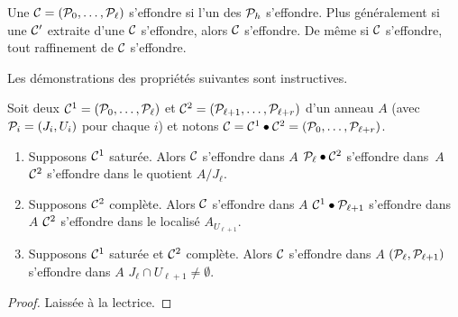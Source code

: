 \begin{lemma} 
\label{lemma} 
\label{factColAc} 
Une \proc ${\cal C}=({\cal P}_0,\ldots,{\cal P}_\ell)$ s'effondre  si l'un des ${\cal P}_h$  s'effondre. Plus généralement si une \proc ${\cal C}'$ extraite d'une \proc ${\cal C}$ s'effondre, alors ${\cal C}$ s'effondre. De même si  ${\cal C}$ s'effondre, tout raffinement de ${\cal C}$ s'effondre.  
\end{lemma}
Les démonstrations des propriétés suivantes sont instructives.
\begin{lemma} 
\label{factSatur} 
Soit deux  \procs ${\cal C}^1=({\cal P}_0,\ldots,{\cal P}_\ell)$ 
et ${\cal C}^2=({\cal P}_{\ell+1},\ldots,{\cal P}_{\ell+r})$
d'un  anneau $A$ (avec ${\cal P}_i=(J_i,U_i)$ pour chaque $i$) et notons ${\cal C}={\cal C}^1\bullet 
{\cal C}^2=({\cal P}_0,\ldots,{\cal P}_{\ell+r})$.
\begin{enumerate}
\item  Supposons ${\cal C}^1$ saturée. Alors ${\cal C}$ s'effondre dans $A$
\ssi ${\cal P}_\ell\bullet {\cal C}^2$   s'effondre dans~$A$
\ssi ${\cal C}^2$   s'effondre dans le quotient $A/J_\ell$. 
\item  Supposons ${\cal C}^2$ complète. Alors ${\cal C}$ s'effondre dans $A$
\ssi $ {\cal C}^1\bullet{\cal P}_{\ell+1}$   s'effondre dans $A$
\ssi ${\cal C}^2$   s'effondre dans le localisé $A_{U_{\ell+1}}$.
\item  Supposons ${\cal C}^1$ saturée et ${\cal C}^2$ complète. 
Alors ${\cal C}$ s'effondre dans $A$  \ssi 
$({\cal P}_\ell,{\cal P}_{\ell+1})$   s'effondre dans $A$
\ssi $J_\ell\cap U_{\ell+1}\not= \emptyset$.
\end{enumerate}
\end{lemma}
\begin{proof}
Laissée à la lectrice.
\end{proof}
